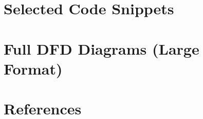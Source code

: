 ﻿\documentclass[12pt, a4paper]{article}
\begin{document}
\section{Selected Code Snippets}
\label{appendix:code}



\section{Full DFD Diagrams (Large Format)}
\label{appendix:dfds}



\clearpage
\section*{References}



\begin{enumerate}[label={[\arabic*]}, leftmargin=2.5em, itemsep=4pt]
    \item 
    \item 
    \item 
\end{enumerate}

\end{document}
